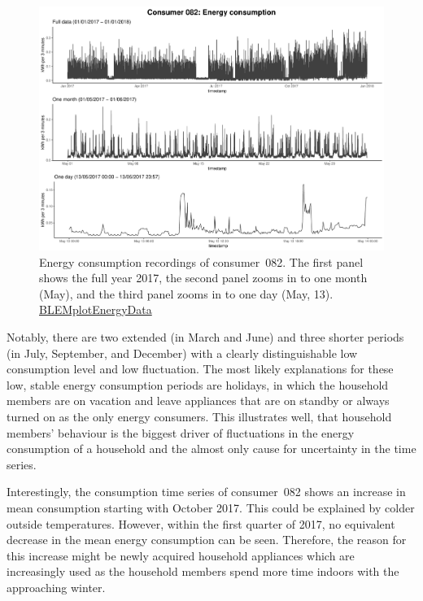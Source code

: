 \begin{figure}[htbp]
 \centering
\includegraphics[width=\textwidth]{thesis/graphs/timeseries/c082_cons.pdf}
\caption[Energy consumption recordings of consumer~082]{Energy consumption recordings of consumer~082. The first panel shows the full year 2017, the second panel zooms in to one month (May), and the third panel zooms in to one day (May, 13). \quantnet\href{https://github.com/QuantLet/BLEM/tree/master/BLEMplotEnergyData}{BLEMplotEnergyData}}
\label{Fig:energycons_c082}
\end{figure}

Notably, there are two extended (in March and June) and three shorter periods (in July, September, and December) with a clearly distinguishable low consumption level and low fluctuation. The most likely explanations for these low, stable energy consumption periods are holidays, in which the household members are on vacation and leave appliances that are on standby or always turned on as the only energy consumers. This illustrates well, that household members' behaviour is the biggest driver of fluctuations in the energy consumption of a household and the almost only cause for uncertainty in the time series.

Interestingly, the consumption time series of consumer~082 shows an increase in mean consumption starting with October 2017. This could be explained by colder outside temperatures. However, within the first quarter of 2017, no equivalent decrease in the mean energy consumption can be seen. Therefore, the reason for this increase might be newly acquired household appliances which are increasingly used as the household members spend more time indoors with the approaching winter.

